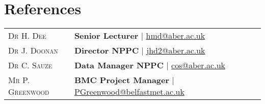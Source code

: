 \documentclass[a4paper,9pt]{article}
\begin{document}
\section{References}
\begin{tabular}{ll}	
  \textsc{Dr H. Dee} & \textbf{Senior Lecturer} | \href{hmd@aber.ac.uk}{hmd@aber.ac.uk}
  \\
  \textsc{Dr J. Doonan} & \textbf{Director NPPC} | \href{jhd2@aber.ac.uk}{jhd2@aber.ac.uk}
  \\
  \textsc{Dr C. Sauze} & \textbf{Data Manager NPPC} | \href{cos@aber.ac.uk}{cos@aber.ac.uk}
\\
  \textsc{Mr P. Greenwood} & \textbf{BMC Project Manager} | \href{PGreenwood@belfastmet.ac.uk}{PGreenwood@belfastmet.ac.uk}
  \\
\end{tabular}
\end{document}

